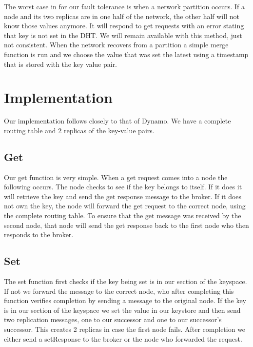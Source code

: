 \documentclass[11pt]{article}
\begin{document}
The worst case in for our fault tolerance is when a network partition occurs. If a node and its two replicas are in one half of the network, the other half will not know those values anymore.  It will respond to get requests with an error stating that key is not set in the DHT. We will remain available with this method, just not consistent. When the network recovers from a partition a simple merge function is run and we choose the value that was set the latest using a timestamp that is stored with the key value pair.


\section{Implementation}\label{sec:imple}

Our implementation follows closely to that of Dynamo. We have a complete routing table and 2 replicas of the key-value pairs.

\subsection{Get}\label{sec:get}

Our get function is very simple. When a get request comes into a node the following occurs. The node checks to see if the key belongs to itself. If it does it will retrieve the key and send the get response message to the broker. If it does not own the key, the node will forward the get request to the correct node, using the complete routing table. To ensure that the get message was received by the second node, that node will send the get response back to the first node who then responds to the broker.

\subsection{Set}\label{sec:set}

The set function first checks if the key being set is in our section of the keyspace. If not we forward the message to the correct node, who after completing this function verifies completion by sending a message to the original node. If the key is in our section of the keyspace we set the value in our keystore and then send two replication messages, one to our successor and one to our successor's successor. This creates 2 replicas in case the first node fails. After completion we either send a setResponse to the broker or the node who forwarded the request.
\end{document}
